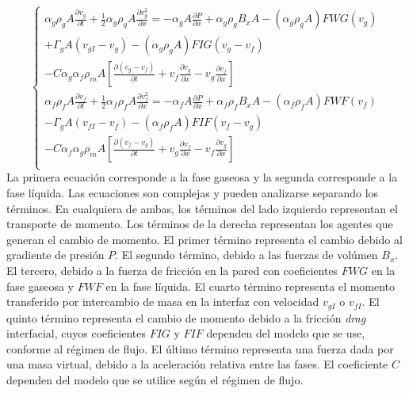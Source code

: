 \begin{equation}
\left \{
\begin{array}{r}
\alpha_g \rho_g A \frac{\partial v_g}{\partial t} + \frac{1}{2} \alpha_g \rho_g A \frac{\partial v_g^2}{\partial x} = 
- \alpha_g A \frac{\partial P}{\partial x} + \alpha_g \rho_g B_x A - \left( \alpha_g \rho_g A \right) FWG \left (v_g \right) \\
+ \Gamma_g A \left( v_{gI} - v_g \right ) - \left ( \alpha_g \rho_g A \right ) FIG \left( v_g - v_f \right) \\
-C\alpha_g\alpha_f\rho_mA \left [ \frac{\partial \left( v_g - v_f \right)}{\partial t} + v_f \frac{\partial v_g}{\partial x} - v_g \frac{\partial v_f}{\partial x} \right ] \\

\alpha_f \rho_f A \frac{\partial v_f}{\partial t} + \frac{1}{2} \alpha_f \rho_f A \frac{\partial v_f^2}{\partial x} = 
- \alpha_f A \frac{\partial P}{\partial x} + \alpha_f \rho_f B_x A - \left( \alpha_f \rho_f A \right) FWF \left (v_f \right) \\
- \Gamma_g A \left( v_{fI} - v_f \right ) - \left ( \alpha_f \rho_f A \right ) FIF \left( v_f - v_g \right) \\
-C\alpha_f\alpha_g\rho_mA \left [ \frac{\partial \left( v_f - v_g \right)}{\partial t} + v_g \frac{\partial v_f}{\partial x} - v_f \frac{\partial v_g}{\partial x} \right ] \\
\end{array}
\right .
\label{relap-momento}
\end{equation}
La primera ecuación corresponde a la fase gaseosa y la segunda corresponde a la fase líquida.
Las ecuaciones son complejas y pueden analizarse separando los términos.
En cualquiera de ambas, los términos del lado izquierdo representan el transporte de momento.
Los términos de la derecha representan los agentes que generan el cambio de momento.
El primer término representa el cambio debido al gradiente de presión $P$.
El segundo término, debido a las fuerzas de volúmen $B_x$.
El tercero, debido a la fuerza de fricción en la pared con coeficientes $FWG$ en la fase gaseosa y $FWF$ en la fase líquida.
El cuarto término representa el momento transferido por intercambio de masa en la interfaz con velocidad $v_{gI}$ o $v_{fI}$.
El quinto término representa el cambio de momento debido a la fricción \textit{drag} interfacial,
cuyos coeficientes $FIG$ y $FIF$ dependen del modelo que se use, conforme al régimen de flujo.
El último término representa una fuerza dada por una masa virtual,
debido a la aceleración relativa entre las fases.
El coeficiente $C$ dependen del modelo que se utilice según el régimen de flujo.


